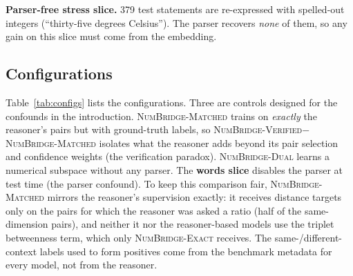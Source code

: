 \documentclass[11pt]{article}
\newcommand{\vExact}{\textup{\textsc{NumBridge-Exact}}\xspace}           %
\newcommand{\vMatched}{\textup{\textsc{NumBridge-Matched}}\xspace}       %
\newcommand{\vVerified}{\textup{\textsc{NumBridge-Verified}}\xspace}     %
\newcommand{\vDual}{\textup{\textsc{NumBridge-Dual}}\xspace}             %
\begin{document}
\textbf{Parser-free stress slice.} 379 test statements are re-expressed with spelled-out integers (``thirty-five degrees
Celsius''). The parser recovers \emph{none} of them, so any gain on this slice must come from the embedding.

\begin{table}[t]
\centering\small
\caption{Benchmark categories. Ground truth is computed in Python for every relation.}
\label{tab:data}
\end{table}

\subsection{Configurations}
Table~\ref{tab:configs} lists the configurations. Three are controls designed for the confounds in the introduction.
\vMatched trains on \emph{exactly} the reasoner's pairs but with ground-truth labels, so \vVerified$-$\vMatched isolates what
the reasoner adds beyond its pair selection and confidence weights (the verification paradox). \vDual learns a
numerical subspace without any parser. The \textbf{words slice} disables the parser at test time (the parser confound). To keep this comparison fair, \vMatched mirrors the reasoner's supervision exactly: it receives distance targets only on the pairs for which the reasoner was asked a ratio (half of the same-dimension pairs), and neither it nor the reasoner-based models use the triplet betweenness term, which only \vExact receives. The same-/different-context labels used to form positives come from the benchmark metadata for every model, not from the reasoner.
\end{document}
